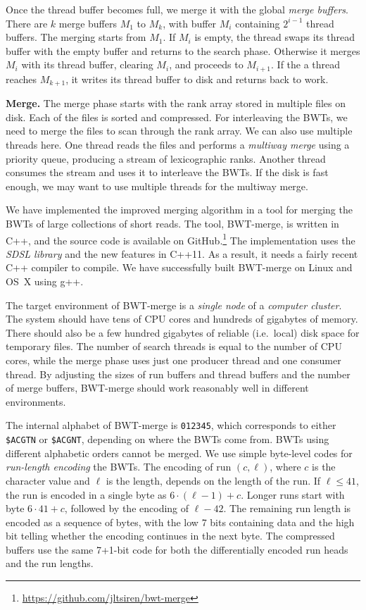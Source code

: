 \documentclass[smallabstract,smallcaptions]{dccpaper}
\newcommand{\BWT}{\textsf{BWT}}
\newcommand{\BWTmerge}{\textsf{BWT\nobreakdash-merge}}
\begin{document}
Once the thread buffer becomes full, we merge it with the global \emph{merge buffers}. There are $k$ merge buffers $M_{1}$ to $M_{k}$, with buffer $M_{i}$ containing $2^{i-1}$ thread buffers. The merging starts from $M_{1}$. If $M_{i}$ is empty, the thread swaps its thread buffer with the empty buffer and returns to the search phase. Otherwise it merges $M_{i}$ with its thread buffer, clearing $M_{i}$, and proceeds to $M_{i+1}$. If the a thread reaches $M_{k+1}$, it writes its thread buffer to disk and returns back to work.

\smallbreak\noindent\textbf{Merge.} The merge phase starts with the rank array stored in multiple files on disk. Each of the files is sorted and compressed. For interleaving the \BWT{}s, we need to merge the files to scan through the rank array. We can also use multiple threads here. One thread reads the files and performs a \emph{multiway merge} using a priority queue, producing a stream of lexicographic ranks. Another thread consumes the stream and uses it to interleave the \BWT{}s. If the disk is fast enough, we may want to use multiple threads for the multiway merge.



We have implemented the improved merging algorithm in a tool for merging the \BWT{}s of large collections of short reads. The tool, \BWTmerge{}, is written in C++, and the source code is available on GitHub.\footnote{\url{https://github.com/jltsiren/bwt-merge}} The implementation uses the \emph{SDSL library} \cite{Gog2014b} and the new features in C++11. As a result, it needs a fairly recent C++ compiler to compile. We have successfully built \BWTmerge{} on Linux and OS~X using g++.

The target environment of \BWTmerge{} is a \emph{single node} of a \emph{computer cluster}. The system should have tens of CPU cores and hundreds of gigabytes of memory. There should also be a few hundred gigabytes of reliable (i.e.~local) disk space for temporary files. The number of search threads is equal to the number of CPU cores, while the merge phase uses just one producer thread and one consumer thread. By adjusting the sizes of run buffers and thread buffers and the number of merge buffers, \BWTmerge{} should work reasonably well in different environments.

The internal alphabet of \BWTmerge{} is \texttt{012345}, which corresponds to either \texttt{\$ACGTN} or \texttt{\$ACGNT}, depending on where the \BWT{}s come from. \BWT{}s using different alphabetic orders cannot be merged. We use simple byte-level codes for \emph{run-length encoding} the \BWT{}s. The encoding of run $(c, \ell)$, where $c$ is the character value and $\ell$ is the length, depends on the length of the run. If $\ell \le 41$, the run is encoded in a single byte as $6 \cdot (\ell-1) + c$. Longer runs start with byte $6 \cdot 41 + c$, followed by the encoding of $\ell-42$. The remaining run length is encoded as a sequence of bytes, with the low 7 bits containing data and the high bit telling whether the encoding continues in the next byte. The compressed buffers use the same 7+1\nobreakdash-bit code for both the differentially encoded run heads and the run lengths.
\end{document}
